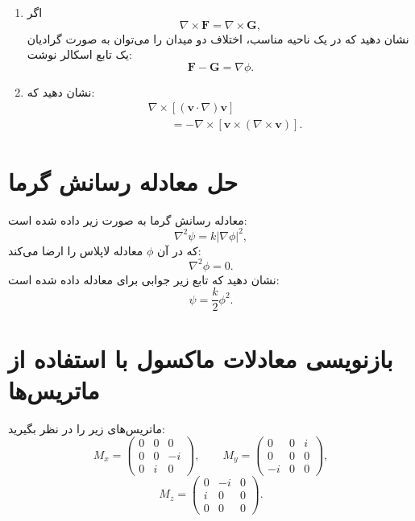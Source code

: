 \documentclass[a4paper,16pt]{article}
\begin{document}
\begin{enumerate}[label=\textbf{\alph*)}]
		\item اگر
		\[
		\nabla\times\mathbf{F}
		=
		\nabla\times\mathbf{G},
		\]
		نشان دهید که در یک ناحیه مناسب، اختلاف دو میدان را
		می‌توان به صورت گرادیان یک تابع اسکالر نوشت:
		\[
		\mathbf{F}-\mathbf{G}=\nabla\phi.
		\]
		
		\item نشان دهید که:
		\[
		\begin{aligned}
			&\nabla\times
			[(\mathbf{v}\cdot\nabla)\mathbf{v}]\\
			&\qquad=
			-\nabla\times
			[\mathbf{v}\times(\nabla\times\mathbf{v})].
		\end{aligned}
		\]
		
	\end{enumerate}
	
	\medskip
	
	
	\section{حل معادله رسانش گرما}
	
	معادله رسانش گرما به صورت زیر داده شده است:
	\[
	\nabla^2\psi=k|\nabla\phi|^2,
	\]
	که در آن \(\phi\) معادله لاپلاس را ارضا می‌کند:
	\[
	\nabla^2\phi=0.
	\]
	نشان دهید که تابع زیر جوابی برای معادله داده شده است:
	\[
	\psi=\frac{k}{2}\phi^2.
	\]
	
	\medskip
	
	
	\section{بازنویسی معادلات ماکسول با استفاده از ماتریس‌ها}
	
	ماتریس‌های زیر را در نظر بگیرید:
	\[
	M_x=
	\begin{pmatrix}
		0&0&0\\
		0&0&-i\\
		0&i&0
	\end{pmatrix},
	\qquad
	M_y=
	\begin{pmatrix}
		0&0&i\\
		0&0&0\\
		-i&0&0
	\end{pmatrix},
	\]
	\[
	M_z=
	\begin{pmatrix}
		0&-i&0\\
		i&0&0\\
		0&0&0
	\end{pmatrix}.
	\]
	
\end{document}
